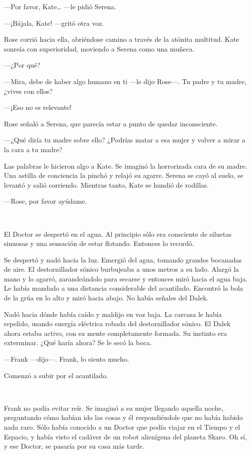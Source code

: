 ---Por favor, Kate\ldots{} ---le pidió Serena.

---¡Bájala, Kate! ---gritó otra voz.

Rose corrió hacia ella, abriéndose camino a través de la atónita
multitud. Kate sonreía con superioridad, moviendo a Serena como una
muñeca.

---¿Por qué?

---Mira, debe de haber algo humano en ti ---le dijo Rose---. Tu padre y tu
madre, ¿vives con ellos?

---¡Eso no es relevante!

Rose señaló a Serena, que parecía estar a punto de quedar inconsciente.

---¿Qué diría tu madre sobre ello? ¿Podrías matar a esa mujer y volver a
mirar a la cara a tu madre?

Las palabras le hicieron algo a Kate. Se imaginó la horrorizada cara de
su madre. Una astilla de conciencia la pinchó y relajó su agarre. Serena
se cayó al suelo, se levantó y salió corriendo. Mientras tanto, Kate se
hundió de rodillas.

---Rose, por favor ayúdame.

~

El Doctor se despertó en el agua. Al principio sólo era consciente de
siluetas sinuosas y una sensación de estar flotando. Entonces lo
recordó.

Se despertó y nadó hacia la luz. Emergió del agua, tomando grandes
bocanadas de aire. El destornillador sónico burbujeaba a unos metros a
su lado. Alargó la mano y lo agarró, zarandeándolo para secarse y
entonces miró hacia el agua baja. Le había mandado a una distancia
considerable del acantilado. Encontró la bola de la grúa en lo alto y
miró hacia abajo. No había señales del Dalek.

Nadó hacia dónde había caído y maldijo en voz baja. La carcasa le había
repelido, usando energía eléctrica robada del destornillador sónico. El
Dalek ahora estaba activo, con su mente completamente formada. Su
instinto era exterminar. ¿Qué haría ahora? Se le secó la boca.

---Frank ---dijo---. Frank, lo siento mucho.

Comenzó a subir por el acantilado.

~

Frank no podía evitar reír. Se imaginó a su mujer llegando aquella
noche, preguntando cómo habían ido las cosas y él respondiéndole que no
había habido nada raro. Sólo había conocido a un Doctor que podía viajar
en el Tiempo y el Espacio, y había visto el cadáver de un robot
alienígena del planeta Skaro. Oh sí, y ese Doctor, se pasaría por su
casa más tarde.


